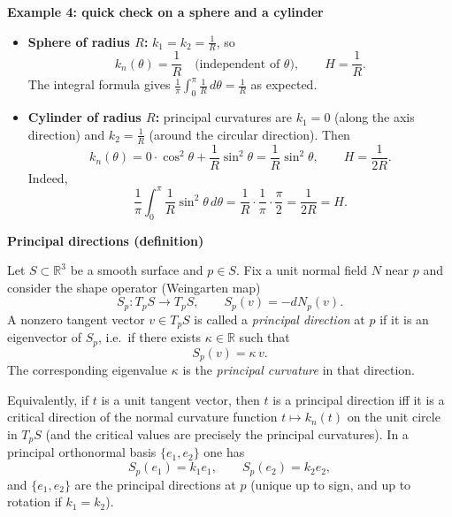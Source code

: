 \begin{solution}
\par\medskip\noindent\textbf{Example 4: quick check on a sphere and a cylinder}\par\smallskip

\begin{itemize}
	\item \textbf{Sphere of radius $R$:} $k_1=k_2=\frac{1}{R}$, so
	\[
	k_n(\theta)=\frac{1}{R}\quad\text{(independent of $\theta$)},\qquad
	H=\frac{1}{R}.
	\]
	The integral formula gives $\frac{1}{\pi}\int_0^\pi \frac{1}{R}\,d\theta=\frac{1}{R}$ as expected.
	
	\item \textbf{Cylinder of radius $R$:} principal curvatures are $k_1=0$ (along the axis direction) and $k_2=\frac{1}{R}$ (around the circular direction). Then
	\[
	k_n(\theta)=0\cdot\cos^2\theta+\frac{1}{R}\sin^2\theta=\frac{1}{R}\sin^2\theta,
	\qquad
	H=\frac{1}{2R}.
	\]
	Indeed,
	\[
	\frac{1}{\pi}\int_0^\pi \frac{1}{R}\sin^2\theta\,d\theta
	=\frac{1}{R}\cdot\frac{1}{\pi}\cdot\frac{\pi}{2}
	=\frac{1}{2R}=H.
	\]
\end{itemize}


\par\medskip\noindent\textbf{Principal directions (definition)}\par\smallskip

Let $S\subset\mathbb R^3$ be a smooth surface and $p\in S$. Fix a unit normal field $N$ near $p$
and consider the shape operator (Weingarten map)
\[
S_p:T_pS\to T_pS,\qquad S_p(v)=-dN_p(v).
\]
A nonzero tangent vector $v\in T_pS$ is called a \emph{principal direction} at $p$ if it is an
eigenvector of $S_p$, i.e.\ if there exists $\kappa\in\mathbb R$ such that
\[
S_p(v)=\kappa\,v.
\]
The corresponding eigenvalue $\kappa$ is the \emph{principal curvature} in that direction.

Equivalently, if $t$ is a unit tangent vector, then $t$ is a principal direction iff it is a
critical direction of the normal curvature function $t\mapsto k_n(t)$ on the unit circle in $T_pS$
(and the critical values are precisely the principal curvatures).
In a principal orthonormal basis $\{e_1,e_2\}$ one has
\[
S_p(e_1)=k_1e_1,\qquad S_p(e_2)=k_2e_2,
\]
and $\{e_1,e_2\}$ are the principal directions at $p$ (unique up to sign, and up to rotation if
$k_1=k_2$).
\end{solution}

